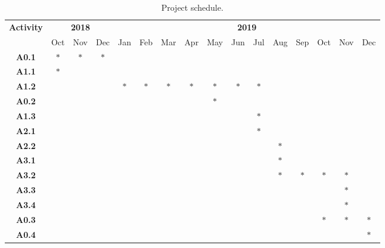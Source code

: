 \documentclass[12pt]{article}
\begin{document}
\begin{table}[H]
\centering
\caption{\small Project schedule.}
\scriptsize
\begin{tabular}{|c|c|c|c|c|c|c|c|c|c|c|c|c|c|c|c|}
	\hline
    \multirow{2}{*}{\textbf{Activity}}
        & \multicolumn{3}{|c|}{\textbf{2018}} & \multicolumn{12}{|c|}{\textbf{2019}}\\
    \cline{2-16}
                  & Oct & Nov & Dec & Jan & Feb & Mar & Apr & May & Jun & Jul & Aug & Sep & Oct & Nov & Dec\\
    \hline
    \textbf{A0.1} & $*$ & $*$ & $*$ &     &     &     &     &     &     &     &     &     &     &     &     \\
    \hline
    \textbf{A1.1} & $*$ &     &     &     &     &     &     &     &     &     &     &     &     &     &     \\
    \hline
    \textbf{A1.2} &     &     &     & $*$ & $*$ & $*$ & $*$ & $*$ & $*$ & $*$ &     &     &     &     &     \\
    \hline
    \textbf{A0.2} &     &     &     &     &     &     &     & $*$ &     &     &     &     &     &     &     \\
    \hline
    \textbf{A1.3} &     &     &     &     &     &     &     &     &     & $*$ &     &     &     &     &     \\
    \hline
    \textbf{A2.1} &     &     &     &     &     &     &     &     &     & $*$ &     &     &     &     &     \\
    \hline
    \textbf{A2.2} &     &     &     &     &     &     &     &     &     &     & $*$ &     &     &     &     \\
    \hline
    \textbf{A3.1} &     &     &     &     &     &     &     &     &     &     & $*$ &     &     &     &     \\
    \hline
    \textbf{A3.2} &     &     &     &     &     &     &     &     &     &     & $*$ & $*$ & $*$ & $*$ &     \\
    \hline
    \textbf{A3.3} &     &     &     &     &     &     &     &     &     &     &     &     &     & $*$ &     \\
    \hline
    \textbf{A3.4} &     &     &     &     &     &     &     &     &     &     &     &     &     & $*$ &     \\
    \hline
    \textbf{A0.3} &     &     &     &     &     &     &     &     &     &     &     &     & $*$ & $*$ & $*$ \\
    \hline
    \textbf{A0.4} &     &     &     &     &     &     &     &     &     &     &     &     &     &     & $*$ \\
    \hline
\end{tabular}
\label{table:sched}
\end{table}
\end{document}
